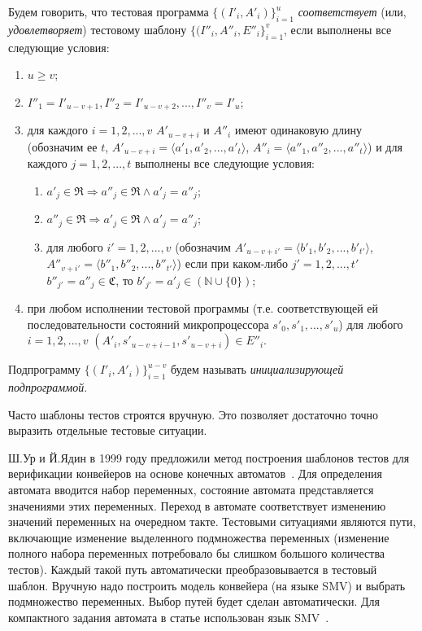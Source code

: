 Будем говорить, что тестовая программа $\{(I'_i, A'_i)\}_{i=1}^u$ \emph{соответствует} (или, \emph{удовлетворяет}) тестовому шаблону $\{(I''_i, A''_i, E''_i\}_{i=1}^v$, если выполнены все следующие условия:
  \begin{enumerate}
    \item $u \geqslant v$;
    \item $I''_1 = I'_{u-v+1}, I''_2 = I'_{u-v+2}, ..., I''_v = I'_u$;
    \item для каждого $i = 1, 2, ..., v$ $A'_{u-v+i}$ и $A''_i$ имеют одинаковую длину (обозначим ее $t$, $A'_{u-v+i} = \langle a'_1, a'_2, ..., a'_t \rangle$, $A''_i = \langle a''_1, a''_2, ..., a''_t \rangle$) и для каждого $j = 1, 2, ..., t$ выполнены все следующие условия:
        \begin{enumerate}
          \item $a'_j \in \mathfrak{R} \Rightarrow a''_j \in \mathfrak{R} \wedge a'_j = a''_j$;
          \item $a''_j \in \mathfrak{R} \Rightarrow a'_j \in \mathfrak{R} \wedge a'_j = a''_j$;
          \item для любого $i' = 1, 2, ..., v$ (обозначим $A'_{u-v+i'} = \langle b'_1, b'_2, ..., b'_{t'}\rangle$, $A''_{v+i'} = \langle b''_1, b''_2, ..., b''_{t'} \rangle$) если при каком-либо $j' = 1, 2, ..., t'$ $b''_{j'} = a''_j \in \mathfrak{C}$, то $b'_{j'} = a'_j \in (\mathbb{N} \cup \{0\})$;
        \end{enumerate}
    \item при любом исполнении тестовой программы (т.е. соответствующей ей последовательности состояний микропроцессора $s'_0, s'_1, ..., s'_u$) для любого $i = 1, 2, ..., v$  $(A'_i, s'_{u-v+i-1}, s'_{u-v+i}) \in E''_i$.
  \end{enumerate}

Подпрограмму $\{(I'_i, A'_i)\}_{i=1}^{u-v}$ будем называть \emph{инициализирующей подпрограммой}.

Часто шаблоны тестов строятся вручную. Это позволяет достаточно точно выразить отдельные тестовые ситуации.

Ш.Ур и Й.Ядин в 1999 году предложили метод построения шаблонов тестов для верификации конвейеров на основе конечных автоматов~\cite{UrFSM}. Для определения автомата вводится набор переменных, состояние автомата представляется значениями этих переменных. Переход в автомате соответствует изменению значений переменных на очередном такте. Тестовыми ситуациями являются пути, включающие изменение выделенного подмножества переменных (изменение полного набора переменных потребовало бы слишком большого количества тестов). Каждый такой путь автоматически преобразовывается в тестовый шаблон. Вручную надо построить модель конвейера (на языке SMV) и выбрать подмножество переменных. Выбор путей будет сделан автоматически. Для компактного задания автомата в статье использован язык SMV~\cite{SMV}.

